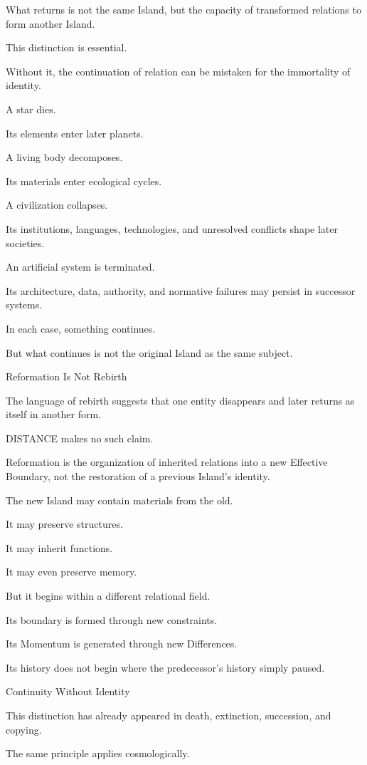 What returns is not the same Island, but the capacity of transformed relations to form another Island.

This distinction is essential.

Without it, the continuation of relation can be mistaken for the immortality of identity.

A star dies.

Its elements enter later planets.

A living body decomposes.

Its materials enter ecological cycles.

A civilization collapses.

Its institutions, languages, technologies, and unresolved conflicts shape later societies.

An artificial system is terminated.

Its architecture, data, authority, and normative failures may persist in successor systems.

In each case, something continues.

But what continues is not the original Island as the same subject.

Reformation Is Not Rebirth

The language of rebirth suggests that one entity disappears and later returns as itself in another form.

DISTANCE makes no such claim.

Reformation is the organization of inherited relations into a new Effective Boundary, not the restoration of a previous Island’s identity.

The new Island may contain materials from the old.

It may preserve structures.

It may inherit functions.

It may even preserve memory.

But it begins within a different relational field.

Its boundary is formed through new constraints.

Its Momentum is generated through new Differences.

Its history does not begin where the predecessor’s history simply paused.

Continuity Without Identity

This distinction has already appeared in death, extinction, succession, and copying.

The same principle applies cosmologically.

